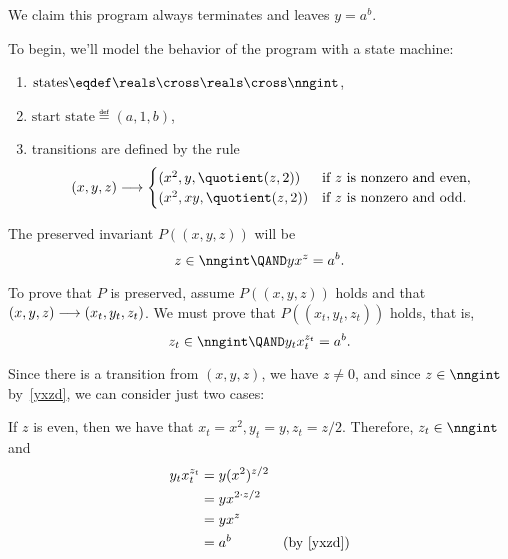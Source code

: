 
We claim this program always terminates and leaves $y = a^b$.

To begin, we'll model the behavior of the program with a state
machine:
\begin{enumerate}
\item $\text{states} \eqdef \reals \cross \reals \cross \nngint$,
\item $\text{start state} \eqdef (a,1,b)$,
\item transitions are defined by the rule
\begin{equation*}
(x,y,z) \movesto
\begin{cases}
(x^2, y, \quotient(z,2)) & \text{if $z$ is nonzero and even},\\
(x^2, xy, \quotient(z,2)) & \text{if $z$ is nonzero and odd}.
\end{cases}
\end{equation*}
\end{enumerate}

The preserved invariant $P((x,y,z))$ will be
\begin{equation}\label{yxzd}
z \in \nngint \QAND yx^z = a^b.
\end{equation}

To prove that $P$ is preserved, assume $P((x,y,z))$ holds
and that $(x,y,z) \mathrel{\longrightarrow} (x_t,y_t,z_t)$.  We must prove that
$P((x_t,y_t,z_t))$ holds, that is,
\begin{equation}\label{ztytxt}
z_t \in \nngint \QAND y_tx_t^{z_t} = a^b.
\end{equation}

Since there is a transition from $(x,y,z)$, we have $z \neq 0$, and since
$z \in \nngint$ by~\eqref{yxzd}, we can consider just two cases:

If $z$ is even, then we have that $x_t = x^2, y_t = y, z_t = z/2$.
Therefore, $z_t \in \nngint$ and
\begin{align*}
y_tx_t^{z_t} & = y(x^2)^{z/2}\\
           & = yx^{2\cdot z/2}\\
           & = yx^z\\
           & = a^b & \mbox{(by~\eqref{yxzd})}
\end{align*}

